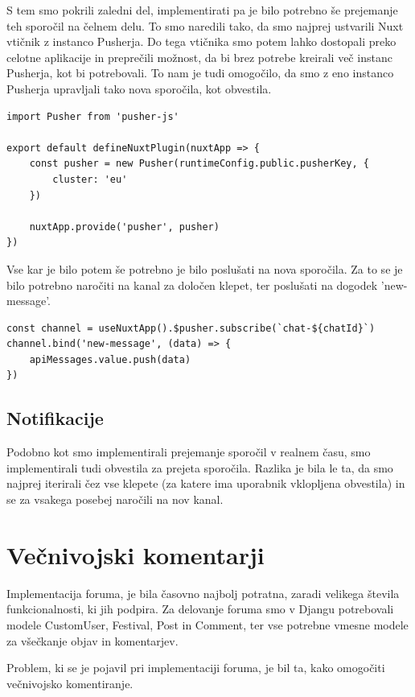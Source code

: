 \documentclass[a4paper,12pt,openright]{book}
\begin{document}
S tem smo pokrili zaledni del, implementirati pa je bilo potrebno še prejemanje teh sporočil na čelnem delu.
To smo naredili tako, da smo najprej ustvarili Nuxt vtičnik z instanco Pusherja.
Do tega vtičnika smo potem lahko dostopali preko celotne aplikacije in preprečili možnost, da bi brez potrebe kreirali več instanc Pusherja, kot bi potrebovali.
To nam je tudi omogočilo, da smo z eno instanco Pusherja upravljali tako nova sporočila, kot obvestila.
\begin{lstlisting}[label=code10,caption=Nuxt vtičnik za novo instanco Pusherja.,frame=tb,captionpos=b]
import Pusher from 'pusher-js'

export default defineNuxtPlugin(nuxtApp => {
    const pusher = new Pusher(runtimeConfig.public.pusherKey, {
        cluster: 'eu'
    })

    nuxtApp.provide('pusher', pusher)
})
\end{lstlisting}
Vse kar je bilo potem še potrebno je bilo poslušati na nova sporočila.
Za to se je bilo potrebno naročiti na kanal za določen klepet, ter poslušati na dogodek 'new-message'.
\begin{lstlisting}[label=code11,caption=Poslušanje na nova sporočila na čelnem delu.,frame=tb,captionpos=b]
const channel = useNuxtApp().$pusher.subscribe(`chat-${chatId}`)       
channel.bind('new-message', (data) => {
    apiMessages.value.push(data)
})
\end{lstlisting}

\subsection{Notifikacije}
Podobno kot smo implementirali prejemanje sporočil v realnem času, smo implementirali tudi obvestila za prejeta sporočila.
Razlika je bila le ta, da smo najprej iterirali čez vse klepete (za katere ima uporabnik vklopljena obvestila) in se za vsakega posebej naročili na nov kanal.

\section{Večnivojski komentarji}
Implementacija foruma, je bila časovno najbolj potratna, zaradi velikega števila funkcionalnosti, ki jih podpira.
Za delovanje foruma smo v Djangu potrebovali modele CustomUser, Festival, Post in Comment, ter vse potrebne vmesne modele za všečkanje objav in komentarjev.

Problem, ki se je pojavil pri implementaciji foruma, je bil ta, kako omogočiti večnivojsko komentiranje.
\end{document}
